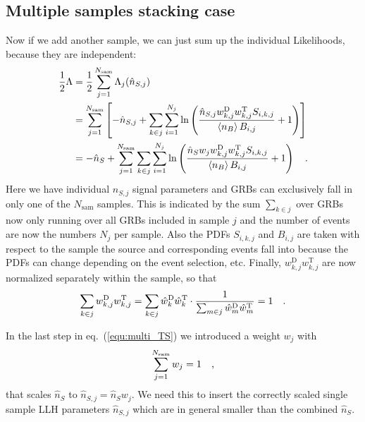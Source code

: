 \subsection{Multiple samples stacking case}

Now if we add another sample, we can just sum up the individual Likelihoods, because they are independent:
\begin{align}
  \frac{1}{2}\Lambda
    &= \frac{1}{2} \sum_{j=1}^{N_\text{sam}} \Lambda_j(\hat{n}_{S,j}) \\
    &= \sum_{j=1}^{N_\text{sam}} \left[
        -\hat{n}_{S,j} + \sum_{k\in j}\sum_{i=1}^{N_j} \ln\left(
          \frac{\hat{n}_{S,j} w_{k,j}^\text{D}w_{k,j}^\text{T}S_{i,k,j}}
               {\Braket{n_B} B_{i,j}} + 1
        \right)
      \right] \\
    &=  -\hat{n}_S + \sum_{j=1}^{N_\text{sam}}
          \sum_{k\in j}\sum_{i=1}^{N_j} \ln\left(
            \frac{\hat{n}_S w_j w_{k,j}^\text{D}w_{k,j}^\text{T}S_{i,k,j}}
                 {\Braket{n_B} B_{i,j}} + 1
        \right) \quad\text{.}
\label{equ:multi_TS}
\end{align}
Here we have individual $n_{S,j}$ signal parameters and GRBs can exclusively fall in only one of the $N_\text{sam}$ samples.
This is indicated by the sum $\sum_{k\in j}$ over GRBs now only running over all GRBs included in sample $j$ and the number of events are now the numbers $N_j$ per sample.
Also the PDFs $S_{i,k,j}$ and $B_{i,j}$ are taken with respect to the sample the source and corresponding events fall into because the PDFs can change depending on the event selection, etc.
Finally, $w_{k,j}^\text{D} w_{k,j}^\text{T}$ are now normalized separately within the sample, so that
\begin{equation}
  \sum_{k\in j} w_{k,j}^\text{D} w_{k,j}^\text{T}
  = \sum_{k\in j} \hat{w}_k^\text{D} \hat{w}_k^\text{T} \cdot
    \frac{1}{\sum_{m\in j} \hat{w}_m^\text{D} \hat{w}_m^\text{T}}
  = 1
  \quad\text{.}
  \label{equ:multi_norm}
\end{equation}

In the last step in eq.~(\ref{equ:multi_TS}) we introduced a weight $w_j$ with
\begin{equation}
  \sum_{j=1}^{N_\text{sam}} w_j = 1 \quad\text{,}
\end{equation}
that scales $\hat{n}_S$ to $\hat{n}_{S,j} = \hat{n}_S w_j$.
We need this to insert the correctly scaled single sample LLH parameters $\hat{n}_{S,j}$ which are in general smaller than the combined $\hat{n}_S$.

